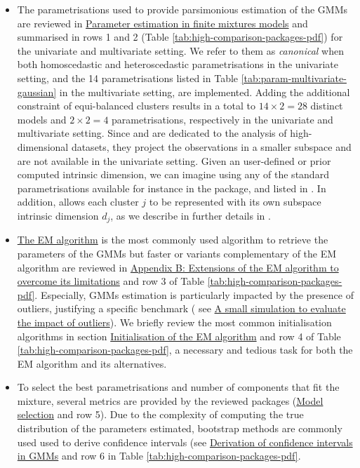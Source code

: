 \begin{itemize}
\item
  The parametrisations used to provide parsimonious estimation of the GMMs are reviewed in \protect\hyperlink{parameter-estimation-in-finite-mixtures-models}{Parameter estimation in finite mixtures models} and summarised in rows 1 and 2 (Table \ref{tab:high-comparison-packages-pdf}) for the univariate and multivariate setting. We refer to them as \emph{canonical} when both homoscedastic and heteroscedastic parametrisations in the univariate setting, and the 14 parametrisations listed in Table \ref{tab:param-multivariate-gaussian} in the multivariate setting, are implemented. Adding the additional constraint of equi-balanced clusters results in a total to \(14 \times 2=28\) distinct models and \(2 \times 2=4\) parametrisations, respectively in the univariate and multivariate setting. \color{blue}Since  and  are dedicated to the analysis of high-dimensional datasets, they project the observations in a smaller subspace and are not available in the univariate setting. Given an user-defined or prior computed intrinsic dimension, we can imagine using any of the standard parametrisations available for instance in the  package, and listed in . In addition,  allows each cluster \(j\) to be represented with its own subspace intrinsic dimension \(d_j\), as we describe in further details in . \color{black}
\item
  \protect\hyperlink{the-em-algorithm}{The EM algorithm} is the most commonly used
  algorithm to retrieve the parameters of the GMMs but faster or variants complementary of the EM algorithm are reviewed in \protect\hyperlink{appendix-b-extensions-of-the-em-algorithm-to-overcome-its-limitations}{Appendix B: Extensions of the EM algorithm to overcome its limitations} and row 3 of Table \ref{tab:high-comparison-packages-pdf}. Especially, GMMs estimation is particularly impacted by the presence of outliers, justifying a specific benchmark ( see \protect\hyperlink{a-small-simulation-to-evaluate-the-impact-of-outliers}{A small simulation to evaluate the impact of outliers}).
  We briefly review the most common initialisation algorithms in section \protect\hyperlink{initialisation-of-the-em-algorithm}{Initialisation of the EM algorithm} and row 4 of Table \ref{tab:high-comparison-packages-pdf}, a necessary and tedious task for both the EM algorithm and its alternatives.
\item
  To select the best parametrisations and number of components that fit the mixture, several metrics are provided by the reviewed packages
  (\protect\hyperlink{model-selection}{Model selection} and row 5). Due to the complexity of computing the true distribution of the parameters estimated, bootstrap methods are commonly used used to derive confidence intervals (see \protect\hyperlink{derivation-of-confidence-intervals-in-gmms}{Derivation of
  confidence intervals in GMMs} and row 6 in Table \ref{tab:high-comparison-packages-pdf}.
\end{itemize}

